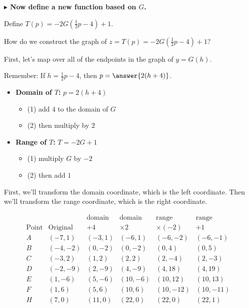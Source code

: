 \documentclass{ximera}
\begin{document}
\begin{example}
\textbf{\textcolor{blue!55!black}{$\blacktriangleright$ Now define a new function based on $G$.}}







Define  $T(p) = -2G\left( \frac{1}{2} p - 4 \right) + 1$.


How do we construct the graph of $z = T(p) = -2G\left(\frac{1}{2} p - 4\right) + 1$?

First, let's map over all of the endpoints in the graph of $y = G(h)$.

Remember: If  $h = \frac{1}{2} p - 4$, then $p = \answer{2(h+4)}$.

\begin{itemize}
 \item \textbf{Domain of $T$:}  $p = 2 (h+4)$ 
    \begin{itemize}
      \item (1) add $4$ to the domain of $G$
      \item (2) then multiply by $2$
    \end{itemize}

 \item \textbf{Range of $T$:}  $T = -2 G + 1$ 
    \begin{itemize}
      \item (1) multiply $G$ by $-2$
      \item (2) then add $1$
    \end{itemize}
\end{itemize}


First, we'll transform the domain coordinate, which is the left coordinate.  Then we'll transform the range coordinate, which is the right coordinate.




\[
\begin{array}{c|l|l|l|l|l}
        &         &  \text{domain}  &  \text{domain}    &  \text{range}   & \text{range}         \\
\text{Point}    &  \text{Original}  &  +4           &  \times2   &  \times(-2)  & + 1          \\
\hline
A   &   (-7, 1)          &  (-3, 1)      &  (-6, 1)     &  (-6, -2)    &  (-6,-1)     \\
B   &   (-4, -2)         &  (0, -2)      &  (0, -2)     &  (0,4)      &  (0,5)       \\
C   &   (-3,2)           &  (1,2)        &  (2,2)       &  (2,-4)     &  (2,-3)     \\
D   &   (-2,-9)          &  (2, -9)      &  (4,-9)      &  (4, 18)    &  (4,19)      \\
E   &   (1,-6)           &  (5,-6)       &  (10,-6)     &  (10,12)    &  (10,13)     \\
F   &   (1,6)            &  (5, 6)       &  (10,6)      &  (10,-12)   &  (10,-11)   \\
H   &   (7,0)            &  (11,0)       &  (22,0)      &  (22,0)     &  (22,1)
\end{array}
\]





\end{example}
\end{document}
